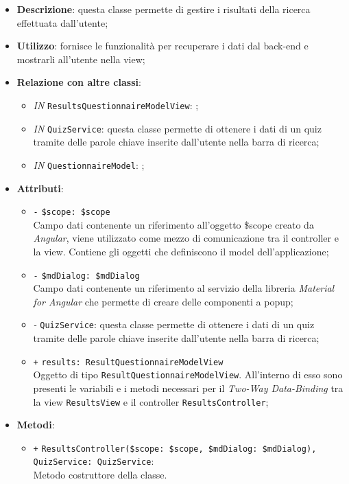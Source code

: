 \begin{itemize}
	\item \textbf{Descrizione}: questa classe permette di gestire i risultati della ricerca effettuata dall'utente;
	\item \textbf{Utilizzo}: fornisce le funzionalità per recuperare i dati dal back-end e mostrarli all'utente nella view;
	\item \textbf{Relazione con altre classi}:
	\begin{itemize}
		\item \textit{IN} \texttt{ResultsQuestionnaireModelView}: ; 
		\item \textit{IN} \texttt{QuizService}: questa classe permette di ottenere i dati di un quiz tramite delle parole chiave inserite dall'utente nella barra di ricerca;
		\item \textit{IN} \texttt{QuestionnaireModel}: ;
	\end{itemize}
	\item \textbf{Attributi}:
	\begin{itemize}
		\item \texttt{-} \texttt{\$scope: \$scope} \\
		Campo dati contenente un riferimento all’oggetto \$scope creato da \textit{Angular}, viene utilizzato come mezzo di comunicazione tra il controller e la view. Contiene gli oggetti che definiscono il model dell’applicazione;
		\item \texttt{-} \texttt{\$mdDialog: \$mdDialog} \\
		Campo dati contenente un riferimento al servizio della libreria \textit{Material for Angular} che permette di creare delle componenti a popup;
		\item \textit{-} \texttt{QuizService}: questa classe permette di ottenere i dati di un quiz tramite delle parole chiave inserite dall'utente nella barra di ricerca;
		\item \texttt{+} \texttt{results: ResultQuestionnaireModelView} \\
		Oggetto di tipo \texttt{ResultQuestionnaireModelView}. All'interno di esso sono presenti le variabili e i metodi necessari per il \textit{Two-Way Data-Binding} tra la view \texttt{ResultsView} e il controller \texttt{ResultsController};
	\end{itemize}
	\item \textbf{Metodi}:
	\begin{itemize}
		\item \texttt{+} \texttt{ResultsController(\$scope: \$scope, \$mdDialog: \$mdDialog), QuizService: QuizService}: \\Metodo costruttore della classe. \\

\end{itemize}
\end{itemize}
